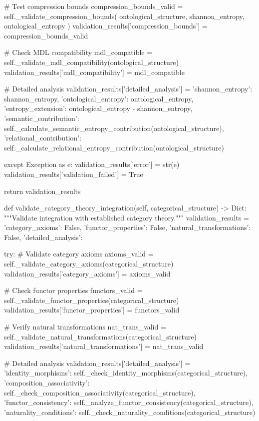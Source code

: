             \# Test compression bounds
            compression_bounds_valid = self._validate_compression_bounds(
                ontological_structure, shannon_entropy, ontological_entropy
            )
            validation_results['compression_bounds'] = compression_bounds_valid
            
            \# Check MDL compatibility
            mdl_compatible = self._validate_mdl_compatibility(ontological_structure)
            validation_results['mdl_compatibility'] = mdl_compatible
            
            \# Detailed analysis
            validation_results['detailed_analysis'] = {
                'shannon_entropy': shannon_entropy,
                'ontological_entropy': ontological_entropy,
                'entropy_extension': ontological_entropy - shannon_entropy,
                'semantic_contribution': self._calculate_semantic_entropy_contribution(ontological_structure),
                'relational_contribution': self._calculate_relational_entropy_contribution(ontological_structure)
            }
            
        except Exception as e:
            validation_results['error'] = str(e)
            validation_results['validation_failed'] = True
            
        return validation_results
        
    def validate_category_theory_integration(self, categorical_structure) -> Dict:
        """Validate integration with established category theory."""
        validation_results = {
            'category_axioms': False,
            'functor_properties': False,
            'natural_transformations': False,
            'detailed_analysis': {}
        }
        
        try:
            \# Validate category axioms
            axioms_valid = self._validate_category_axioms(categorical_structure)
            validation_results['category_axioms'] = axioms_valid
            
            \# Check functor properties
            functors_valid = self._validate_functor_properties(categorical_structure)
            validation_results['functor_properties'] = functors_valid
            
            \# Verify natural transformations
            nat_trans_valid = self._validate_natural_transformations(categorical_structure)
            validation_results['natural_transformations'] = nat_trans_valid
            
            \# Detailed analysis
            validation_results['detailed_analysis'] = {
                'identity_morphisms': self._check_identity_morphisms(categorical_structure),
                'composition_associativity': self._check_composition_associativity(categorical_structure),
                'functor_consistency': self._analyze_functor_consistency(categorical_structure),
                'naturality_conditions': self._check_naturality_conditions(categorical_structure)
            }
            
